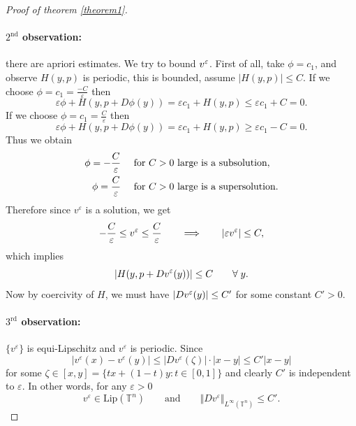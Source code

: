 \documentclass[12pt, oneside]{amsart}  	%
\begin{document}
\begin{proof}[Proof of theorem \ref{theorem1}]
\paragraph{\textbf{$2^{\text{nd}}$ observation:}} there are apriori estimates. We try to bound $v^\varepsilon$. First of all, take $\phi=c_1$, and observe $H(y,p)$ is periodic, this is bounded, assume $|H(y,p)|\leq C$. If we choose $\phi = c_1 = \frac{-C}{\varepsilon}$ then
\begin{equation*}
\varepsilon \phi + H(y,p+D\phi(y)) = \varepsilon c_1 + H(y,p) \leq \varepsilon c_1 + C =0.
\end{equation*}
If we choose $\phi = c_1 = \frac{C}{\varepsilon}$ then
\begin{equation*}
\varepsilon \phi + H(y,p+D\phi(y)) = \varepsilon c_1 + H(y,p) \geq \varepsilon c_1 - C =0.
\end{equation*}
Thus we obtain
\begin{align*}
\phi = -\frac{C}{\varepsilon}\quad &\text{ for $C>0$ large is a subsolution}, \\
\phi = \frac{C}{\varepsilon}\quad &\text{ for $C>0$ large is a supersolution}.
\end{align*}
Therefore since $v^\varepsilon$ is a solution, we get
\begin{equation*}
-\frac{C}{\varepsilon} \le v^\varepsilon \le \frac{C}{\varepsilon} \qquad\Longrightarrow\qquad |\varepsilon v^\varepsilon| \leq C,
\end{equation*}
which implies
\begin{equation*}
|H(y, p + Dv^\varepsilon(y))|\le C \qquad\forall\;y.
\end{equation*}
Now by coercivity of $H$, we must have $|Dv^\varepsilon(y)|\le C'$ for some constant $C'>0$.\\

\paragraph{\textbf{$3^{\text{rd}}$ observation:}} $\{v^\varepsilon\}$ is equi-Lipschitz and $v^\varepsilon$ is periodic. Since
\begin{equation*}
|v^\varepsilon(x) - v^\varepsilon(y)|\leq |Dv^\varepsilon(\zeta)|\cdot |x-y| \leq C'|x-y|
\end{equation*}
for some $\zeta\in [x,y] = \{tx+(1-t)y: t\in [0,1]\}$ and clearly $C'$ is independent to $\varepsilon$. In other words, for any $\varepsilon>0$
\begin{equation*}
v^\varepsilon \in \text{Lip}(\mathbb{T}^n)\qquad\text{and}\qquad \Vert Dv^\varepsilon\Vert_{L^\infty(\mathbb{T}^n)} \leq C'.
\end{equation*}


\end{proof}
\end{document}
